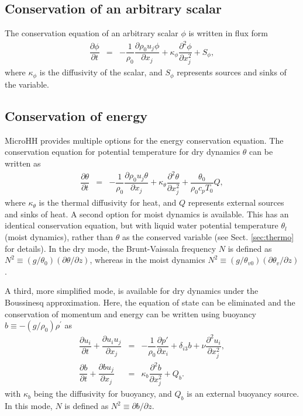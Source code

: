 \documentclass[gmd,manuscript]{copernicus}
\begin{document}
\subsection{Conservation of an arbitrary scalar}
The conservation equation of an arbitrary scalar $\phi$ is written in flux form
\begin{eqnarray}
\dfrac{\partial \phi}{\partial t} & = & - \dfrac{1}{\rho_0} \dfrac{\partial \rho_0 u_j \phi}{\partial x_j} +
\kappa_\phi \dfrac{\partial^2 \phi}{\partial x_j^2} + S_\phi, \label{eq:consscal}
\end{eqnarray}
where $\kappa_\phi$ is the diffusivity of the scalar, and $S_\phi$ represents sources and sinks of the variable.

\subsection{Conservation of energy}\label{sec:dyncore_energy}
\label{sec:conservation_of_energy}
MicroHH provides multiple options for the energy conservation equation. The conservation equation for  potential temperature for dry dynamics $\theta$ can be written as
\begin{eqnarray}
\dfrac{\partial \theta}{\partial t} & = & - \dfrac{1}{\rho_0} \dfrac{\partial \rho_0 u_j \theta}{\partial x_j} + \kappa_\theta \dfrac{\partial^2 \theta}{\partial x_j^2} + \dfrac{\theta_0}{\rho_0 c_p T_0} Q,\label{eq:consthermo}
\end{eqnarray}
where $\kappa_\theta$ is the thermal diffusivity for heat, and $Q$ represents external sources and sinks of heat. A second option for moist dynamics is available. This has an identical conservation equation, but with liquid water potential temperature $\theta_l$ (moist dynamics), rather than $\theta$ as the conserved variable (see Sect. \ref{sec:thermo} for details). In the dry mode, the Brunt-Vaissala frequency $N$ is defined as $N^2 \equiv \left(g/\theta_0\right) \left( \partial \theta/\partial z \right)$, whereas in the moist dynamics $N^2 \equiv \left(g/\theta_{v0}\right) \left( \partial \theta_v/\partial z \right)$.

A third, more simplified mode, is available for dry dynamics under the Boussinesq approximation. Here, the equation of state can be eliminated and the conservation of momentum and energy can be written using buoyancy $b \equiv -(g/\rho_0)\rho^\prime$ as
\begin{eqnarray}
\dfrac{\partial u_i}{\partial t} + \dfrac{\partial u_i u_j}{\partial x_j} & = & 
- \dfrac{1}{\rho_0}\dfrac{\partial p'}{\partial x_i} + \delta_{i3} b + \nu \dfrac{\partial^2 u_i}{\partial x_j^2}\label{eq:consmombsimp},\\
\dfrac{\partial b}{\partial t} + \dfrac{\partial b u_j}{\partial x_j} & = & 
\kappa_b \dfrac{\partial^2 b}{\partial x_j^2} + Q_b \label{eq:consbsimp}.
\end{eqnarray}
with $\kappa_b$ being the diffusivity for buoyancy, and $Q_b$ is an external buoyancy source. In this mode, $N$ is defined as $N^2 \equiv \partial b/\partial z$.
\end{document}
